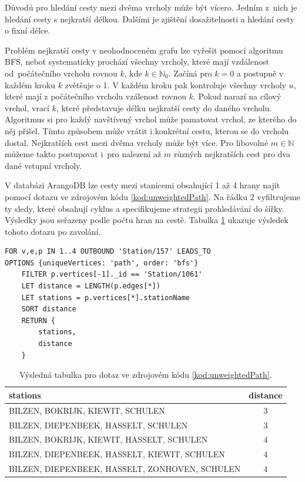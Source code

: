 \documentclass[
  program=infoi,
  biblatex=true,
  figures=true,
  glossaries=false,
  index,
  sourcecodes=true
]{kidiplom}
\begin{document}
Důvodů pro hledání cesty mezi dvěma vrcholy může být vícero. Jedním z~nich je hledání cesty s nejkratší délkou. Dalšími je zjištění dosažitelnosti a hledání cesty o fixní délce.

Problém nejkratší cesty v neohodnoceném grafu lze vyřešit pomocí algoritmu BFS, neboť systematicky prochází všechny vrcholy, které mají vzdálenost od~počátečního vrcholu rovnou $k$, kde $ k \in \mathbb{N}_0 $. Začíná pro $ k = 0 $ a postupně v každém kroku $ k $ zvětšuje o 1. V každém kroku pak kontroluje všechny vrcholy $u$, které mají z počátečního vrcholu vzálenost rovnou $k$. Pokud narazí na cílový vrchol, vrací $k$, které představuje délku nejkratší cesty do daného vrcholu. Algoritmus si pro každý navštívený vrchol může pamatovat vrchol, ze kterého do něj přišel. Tímto způsobem může vrátit i konkrétní cestu, kterou se do vrcholu dostal. Nejkratších cest mezi dvěma vrcholy může být více. Pro libovolné $ m \in \mathbb{N} $ můžeme takto postupovat i~pro nalezení až $ m $ různých nejkratších cest pro dva dané vstupní vrcholy.

V databázi ArangoDB lze cesty mezi stanicemi obsahující 1 až 4 hrany najít pomocí dotazu ve zdrojovém kódu \ref{kod:unweightedPath}. Na řádku 2 vyfiltrujeme ty sledy, které obsahují cyklus a specifikujeme strategii prohledávání do šířky. Výsledky jsou seřazeny podle počtu hran na cestě. Tabulka \ref{tab:ShortestPath-Unweighted-Example} ukazuje výsledek tohoto dotazu po zavolání.

\begin{listing}[h]
\begin{verbatim}
FOR v,e,p IN 1..4 OUTBOUND 'Station/157' LEADS_TO
OPTIONS {uniqueVertices: 'path', order: 'bfs'}
    FILTER p.vertices[-1]._id == 'Station/1061'
    LET distance = LENGTH(p.edges[*])
    LET stations = p.vertices[*].stationName
    SORT distance
    RETURN { 
        stations,
        distance
    }
\end{verbatim}
\caption{Cesty v neohodnoceném grafu.}
\label{kod:unweightedPath}
\end{listing}

\begin{table}[h]
\begin{center}
\caption[Tabulka výsledků]{Výsledná tabulka pro dotaz ve zdrojovém kódu \ref{kod:unweightedPath}.}
\label{tab:ShortestPath-Unweighted-Example}
\begin{tabular}{ | l | c | }
 \hline
 \textbf{stations}  & \textbf{distance} \\
 \hline \hline
 BILZEN, BOKRIJK, KIEWIT, SCHULEN & 3 \\
 BILZEN, DIEPENBEEK, HASSELT, SCHULEN & 3 \\
 BILZEN, BOKRIJK, KIEWIT, HASSELT, SCHULEN & 4 \\
 BILZEN, DIEPENBEEK, HASSELT, KIEWIT, SCHULEN & 4 \\
 BILZEN, DIEPENBEEK, HASSELT, ZONHOVEN, SCHULEN & 4 \\
 \hline
\end{tabular}
\end{center}
\end{table}
\end{document}

